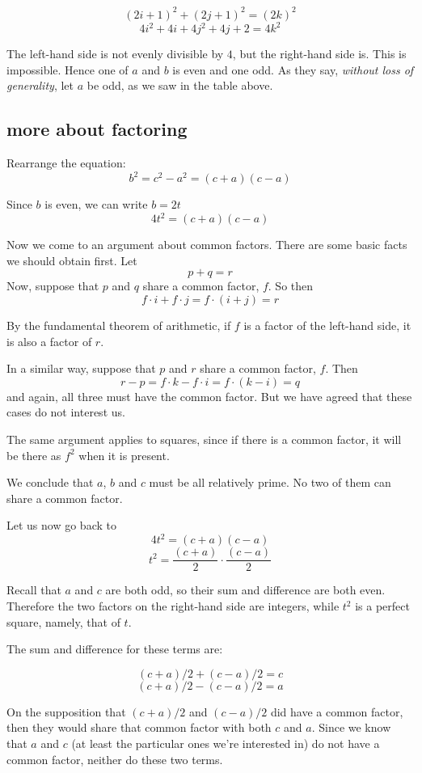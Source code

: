 \documentclass[11pt, oneside]{article}
\begin{document}
\[ (2i + 1)^2 + (2j + 1)^2 = (2k)^2 \]
\[ 4i^2 + 4i + 4j^2 + 4j + 2 = 4k^2 \]

The left-hand side is not evenly divisible by $4$, but the right-hand side is.  This is impossible.  Hence one of $a$ and $b$ is even and one odd.  As they say, \emph{without loss of generality}, let $a$ be odd, as we saw in the table above.

\subsection*{more about factoring}

Rearrange the equation:
\[ b^2 = c^2 - a^2  = (c + a)(c - a) \]

Since $b$ is even, we can write $b = 2t$
\[ 4t^2 = (c + a)(c - a) \]

Now we come to an argument about common factors.  There are some basic facts we should obtain first.  Let
\[ p + q = r \]
Now, suppose that $p$ and $q$ share a common factor, $f$.  So then
\[ f \cdot i + f \cdot j = f \cdot (i + j) = r \] 

By the fundamental theorem of arithmetic, if $f$ is a factor of the left-hand side, it is also a factor of $r$.  

In a similar way, suppose that $p$ and $r$ share a common factor, $f$.  Then
\[ r - p = f \cdot k - f \cdot i = f \cdot (k-i) = q \] 
and again, all three must have the common factor.  But we have agreed that these cases do not interest us.

The same argument applies to squares, since if there is a common factor, it will be there as $f^2$ when it is present.

We conclude that $a$, $b$ and $c$ must be all relatively prime.  No two of them can share a common factor.

Let us now go back to 
\[ 4t^2 = (c + a)(c - a) \]
\[ t^2 = \frac{(c + a)}{2} \cdot \frac{(c - a)}{2} \]

Recall that $a$ and $c$ are both odd, so their sum and difference are both even.  Therefore
the two factors on the right-hand side are integers, while $t^2$ is a perfect square, namely, that of $t$.  

The sum and difference for these terms are:

\[ (c + a)/2 + (c - a)/2 = c \]
\[ (c + a)/2 - (c - a)/2 = a \]

On the supposition that $(c+a)/2$ and $(c-a)/2$ did have a common factor, then they would share that common factor with both $c$ and $a$.   Since we know that $a$ and $c$ (at least the particular ones we're interested in) do not have a common factor, neither do these two terms.
\end{document}
